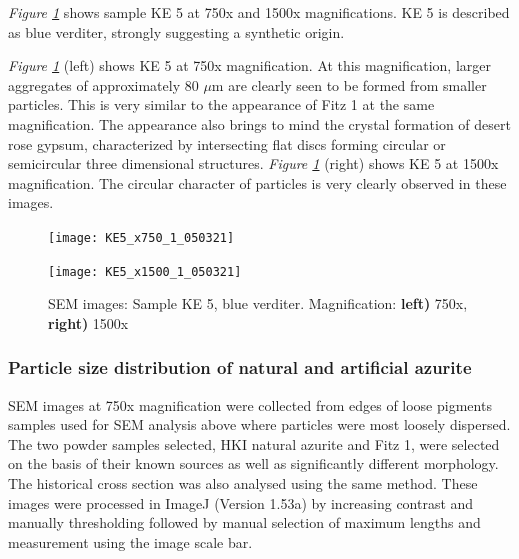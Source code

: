 
\textit{Figure \ref{fig:KE5_sem_1}} shows sample KE 5 at 750x and 1500x magnifications. KE 5 is described as blue verditer, strongly suggesting a synthetic origin.

\textit{Figure \ref{fig:KE5_sem_1}} (left) shows KE 5 at 750x magnification. At this magnification, larger aggregates of approximately 80 $\mu$m are clearly seen to be formed from smaller particles. This is very similar to the appearance of Fitz 1 at the same magnification. The appearance also brings to mind the crystal formation of desert rose gypsum, characterized by intersecting flat discs forming circular or semicircular three dimensional structures. \textit{Figure \ref{fig:KE5_sem_1}} (right) shows KE 5 at 1500x magnification. The circular character of particles is very clearly observed in these images.


\begin{figure}[H]
\centering
\begin{minipage}{.45\textwidth}
  \centering
  \texttt{[image: KE5\_x750\_1\_050321]}
\end{minipage}
\begin{minipage}{.45\textwidth}
  \centering
  \texttt{[image: KE5\_x1500\_1\_050321]}
\end{minipage}
\caption[SEM images: Sample KE 5, blue verditer]{SEM images: Sample KE 5, blue verditer. Magnification: \textbf{left)} 750x, \textbf{right)} 1500x}
\label{fig:KE5_sem_1}
\end{figure}

\subsubsection[Particle size distribution of natural and artificial azurite]{Particle size distribution of natural and artificial azurite}
\label{subsubsection3.1.1.1}

SEM images at 750x magnification were collected from edges of loose pigments samples used for SEM analysis above where particles were most loosely dispersed. The two powder samples selected, HKI natural azurite and Fitz 1, were selected on the basis of their known sources as well as significantly different morphology. The historical cross section was also analysed using the same method. These images were processed in ImageJ (Version 1.53a) by increasing contrast and manually thresholding followed by manual selection of maximum lengths and measurement using the image scale bar. 

